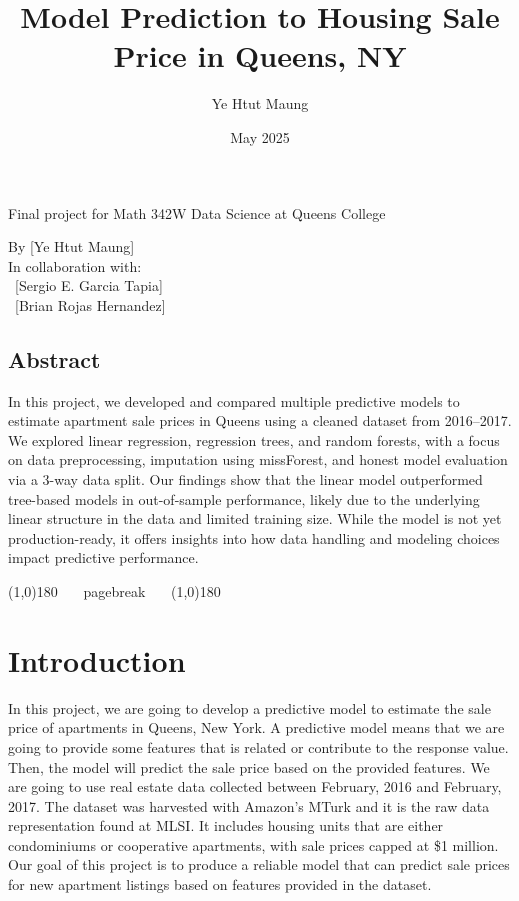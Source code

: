 \documentclass[12pt]{article}
\title{Model Prediction to Housing Sale Price in Queens, NY}
\author{Ye Htut Maung}
\date{May 2025}
\begin{document}
\maketitle
\begin{center}
    \footnotesize Final project for Math 342W Data Science at Queens College\\
\end{center}



\begin{flushright}
By [Ye Htut Maung]\\
In collaboration with:\\
~[Sergio E. Garcia Tapia]~\\
~[Brian Rojas Hernandez]~\\

\end{flushright}


\subsection*{Abstract}

In this project, we developed and compared multiple predictive models to estimate apartment sale prices in Queens using a cleaned dataset from 2016–2017. We explored linear regression, regression trees, and random forests, with a focus on data preprocessing, imputation using missForest, and honest model evaluation via a 3-way data split. Our findings show that the linear model outperformed tree-based models in out-of-sample performance, likely due to the underlying linear structure in the data and limited training size. While the model is not yet production-ready, it offers insights into how data handling and modeling choices impact predictive performance.

\line(1,0){180} ~~~pagebreak~~~ \line(1,0){180}

\section{Introduction}

In this project, we are going to develop a predictive model to estimate the sale price of apartments in Queens, New York. A predictive model means that we are going to provide some features that is related or contribute to the response value. Then, the model will predict the sale price based on the provided features. We are going to use real estate data collected between February, 2016 and February, 2017. The dataset was harvested with Amazon's MTurk and it is the raw data representation found at MLSI. It includes housing units that are either condominiums or cooperative apartments, with sale prices capped at \$1 million. Our goal of this project is to produce a reliable model that can predict sale prices for new apartment listings based on features provided in the dataset. 
\end{document}
